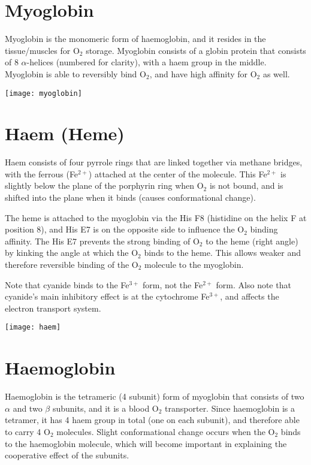 \section{Myoglobin}

Myoglobin is the monomeric form of haemoglobin, and it resides in the tissue/muscles for O$_2$ storage.
Myoglobin consists of a globin protein that consists of 8 $\alpha$-helices (numbered for clarity), with a haem group in the middle.
Myoglobin is able to reversibly bind O$_2$, and have high affinity for O$_2$ as well.

\begin{center}
\texttt{[image: myoglobin]}
\end{center}

\section{Haem (Heme)}

Haem consists of four pyrrole rings that are linked together via methane bridges, with the ferrous (Fe$^{2+}$) attached at the center of the molecule.
This Fe$^{2+}$ is slightly below the plane of the porphyrin ring when O$_2$ is not bound, and is shifted into the plane when it binds (causes conformational change).

The heme is attached to the myoglobin via the His F8 (histidine on the helix F at position 8), and His E7 is on the opposite side to influence the O$_2$ binding affinity.
The His E7 prevents the strong binding of O$_2$ to the heme (right angle) by kinking the angle at which the O$_2$ binds to the heme.
This allows weaker and therefore reversible binding of the O$_2$ molecule to the myoglobin.

Note that cyanide binds to the Fe$^{3+}$ form, not the Fe$^{2+}$ form.
Also note that cyanide's main inhibitory effect is at the cytochrome Fe$^{3+}$, and affects the electron transport system.

\begin{center}
\texttt{[image: haem]}
\end{center}

\section{Haemoglobin}

Haemoglobin is the tetrameric (4 subunit) form of myoglobin that consists of two $\alpha$ and two $\beta$ subunits, and it is a blood O$_2$ transporter.
Since haemoglobin is a tetramer, it has 4 haem group in total (one on each subunit), and therefore able to carry 4 O$_2$ molecules.
Slight conformational change occurs when the O$_2$ binds to the haemoglobin molecule, which will become important in explaining the cooperative effect of the subunits.

